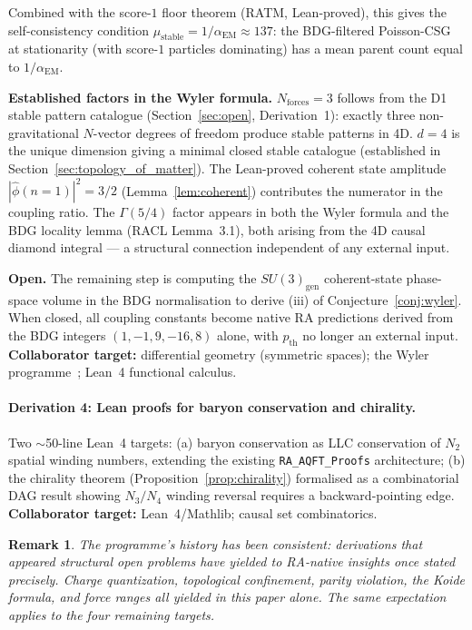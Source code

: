 \documentclass[11pt,a4paper]{article}
\newtheorem{remark}[theorem]{Remark}
\begin{document}
Combined with the score-$1$ floor theorem (RATM, Lean-proved),
this gives the self-consistency condition $\mu_{\mathrm{stable}} = 1/\alpha_{\mathrm{EM}} \approx 137$:
the BDG-filtered Poisson-CSG at stationarity (with score-$1$ particles
dominating) has a mean parent count equal to $1/\alpha_{\mathrm{EM}}$.

\textbf{Established factors in the Wyler formula.}
$N_{\mathrm{forces}} = 3$ follows from the D1 stable pattern catalogue
(Section~\ref{sec:open}, Derivation~1): exactly three non-gravitational
$N$-vector degrees of freedom produce stable patterns in 4D.
$d = 4$ is the unique dimension giving a minimal closed stable catalogue
(established in Section~\ref{sec:topology_of_matter}).
The Lean-proved coherent state amplitude $|\hat\phi(n{=}1)|^2 = 3/2$
(Lemma~\ref{lem:coherent}) contributes the numerator in the coupling ratio.
The $\Gamma(5/4)$ factor appears in both the Wyler formula and the BDG
locality lemma (RACL Lemma~3.1), both arising from the 4D causal diamond
integral — a structural connection independent of any external input.

\textbf{Open.}
The remaining step is computing the $SU(3)_{\mathrm{gen}}$ coherent-state
phase-space volume in the BDG normalisation to derive (iii) of
Conjecture~\ref{conj:wyler}. When closed, all coupling constants become
native RA predictions derived from the BDG integers $(1,-1,9,-16,8)$ alone,
with $p_{\mathrm{th}}$ no longer an external input.
\textbf{Collaborator target:} differential geometry (symmetric spaces);
the Wyler programme~\citep{Wyler1969}; Lean~4 functional calculus.


\paragraph{Derivation 4: Lean proofs for baryon conservation and chirality.}
Two $\sim$50-line Lean~4 targets: (a) baryon conservation as LLC conservation
of $N_2$ spatial winding numbers, extending the existing
\texttt{RA\_AQFT\_Proofs} architecture; (b) the chirality theorem
(Proposition~\ref{prop:chirality}) formalised as a combinatorial DAG result
showing $N_3/N_4$ winding reversal requires a backward-pointing edge.
\textbf{Collaborator target:} Lean~4/Mathlib; causal set combinatorics.

\begin{remark}
The programme's history has been consistent: derivations that appeared
structural open problems have yielded to RA-native insights once stated
precisely. Charge quantization, topological confinement, parity violation,
the Koide formula, and force ranges all yielded in this paper alone. The
same expectation applies to the four remaining targets.
\end{remark}
\end{document}
